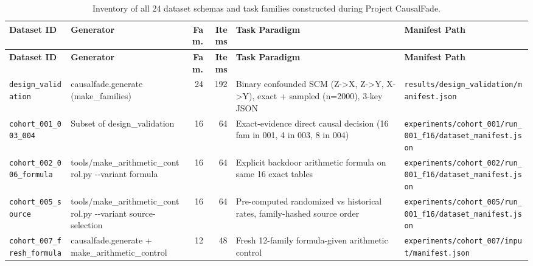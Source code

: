 {\footnotesize
\setlength{\tabcolsep}{3.5pt}
\begin{longtable}{@{}>{\raggedright\arraybackslash}p{2.6cm}>{\raggedright\arraybackslash}p{2.3cm}rr>{\raggedright\arraybackslash}p{4.6cm}>{\raggedright\arraybackslash}p{3.2cm}@{}}
\caption{Inventory of all 24 dataset schemas and task families constructed during Project CausalFade.}\label{tab:dataset_inventory}\\
\toprule
\textbf{Dataset ID} & \textbf{Generator} & \textbf{Fam.} & \textbf{Items} & \textbf{Task Paradigm} & \textbf{Manifest Path} \\
\midrule
\endfirsthead
\toprule
\textbf{Dataset ID} & \textbf{Generator} & \textbf{Fam.} & \textbf{Items} & \textbf{Task Paradigm} & \textbf{Manifest Path} \\
\midrule
\endhead
\bottomrule
\endfoot
\texttt{design\_validation} & causalfade.generate (make\_families) & 24 & 192 & Binary confounded SCM (Z-\allowbreak{}>X, Z-\allowbreak{}>Y, X-\allowbreak{}>Y), exact + sampled (n=2000), 3-\allowbreak{}key JSON & \texttt{results/\allowbreak{}design\_validation/\allowbreak{}manifest.json} \\[2pt]
\texttt{cohort\_001\_003\_004} & Subset of design\_validation & 16 & 64 & Exact-\allowbreak{}evidence direct causal decision (16 fam in 001, 4 in 003, 8 in 004) & \texttt{experiments/\allowbreak{}cohort\_001/\allowbreak{}run\_001\_f16/\allowbreak{}dataset\_manifest.json} \\[2pt]
\texttt{cohort\_002\_006\_formula} & tools/\allowbreak{}make\_arithmetic\_control.py -\allowbreak{}-\allowbreak{}variant formula & 16 & 64 & Explicit backdoor arithmetic formula on same 16 exact tables & \texttt{experiments/\allowbreak{}cohort\_002/\allowbreak{}run\_001\_f16/\allowbreak{}dataset\_manifest.json} \\[2pt]
\texttt{cohort\_005\_source} & tools/\allowbreak{}make\_arithmetic\_control.py -\allowbreak{}-\allowbreak{}variant source-\allowbreak{}selection & 16 & 64 & Pre-\allowbreak{}computed randomized vs historical rates, family-\allowbreak{}hashed source order & \texttt{experiments/\allowbreak{}cohort\_005/\allowbreak{}run\_001\_f16/\allowbreak{}dataset\_manifest.json} \\[2pt]
\texttt{cohort\_007\_fresh\_formula} & causalfade.generate + make\_arithmetic\_control & 12 & 48 & Fresh 12-\allowbreak{}family formula-\allowbreak{}given arithmetic control & \texttt{experiments/\allowbreak{}cohort\_007/\allowbreak{}input/\allowbreak{}manifest.json} \\[2pt]

\end{longtable}}
